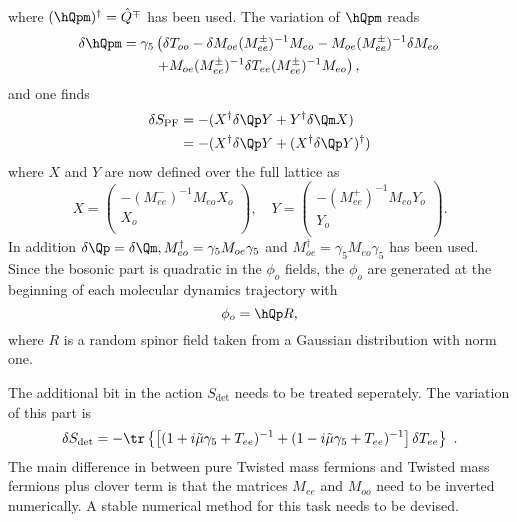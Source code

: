 where $(\hQpm)^\dagger = \hat Q^\mp$ has been used. The variation of
$\hQpm$ reads
\begin{equation}
  \label{eq:eosw7}
  \begin{split}
    \delta \hQpm = \gamma_5 & \left( \delta T_{oo}-\delta M_{oe}(M_{ee}^\pm )^{-1}M_{eo} -
      M_{oe}(M_{ee}^\pm )^{-1}\delta M_{eo}\right. \\
  &\left. + M_{oe}(M_{ee}^\pm )^{-1} \delta T_{ee} (M_{ee}^\pm )^{-1} M_{eo}\right),
  \end{split}
\end{equation}
and one finds
\begin{equation}
  \label{eq:eosw8}
  \begin{split}
    \delta S_\mathrm{PF} &= -(X^\dagger\delta \Qp Y + Y^\dagger\delta \Qm X) \\
    &= -(X^\dagger\delta \Qp Y +(X^\dagger\delta \Qp Y)^\dagger)
  \end{split}
\end{equation}
where $X$ and $Y$ are now defined over the full lattice as
\begin{equation}
  \label{eq:eosw9}
  X = 
  \begin{pmatrix}
    -(M_{ee}^-)^{-1}M_{eo}X_o \\ X_o\\
  \end{pmatrix},\quad
  Y = 
  \begin{pmatrix}
    -(M_{ee}^+)^{-1}M_{eo}Y_o \\ Y_o\\
  \end{pmatrix}.
\end{equation}
In addition $\delta\Qp = \delta\Qm, M_{eo}^\dagger = \gamma_5 M_{oe}\gamma_5$ and
$M_{oe}^\dagger = \gamma_5 M_{eo}\gamma_5$ has been used. Since the bosonic part
is quadratic in the $\phi_o$ fields, the $\phi_o$ are generated at the
beginning of each molecular dynamics trajectory with
\begin{equation}
  \label{eq:eosw10}
  \phi_o = \hQp R,
\end{equation}
where $R$ is a random spinor field taken from a Gaussian distribution
with norm one.

The additional bit in the action $S_{\det}$ needs to be treated
seperately. The variation of this part is
\begin{equation}
  \label{eq:eosw11}
  \delta S_{\det} = -\tr \left\{ \left[(1+i\tilde\mu\gamma_5 + T_{ee})^{-1}  +
    (1-i\tilde\mu\gamma_5 + T_{ee})^{-1}\right] \delta T_{ee} \right\} \ . 
\end{equation}
The main difference in between pure Twisted mass fermions and Twisted
mass fermions plus clover term is that the matrices $M_{ee}$ and
$M_{oo}$ need to be inverted numerically. A stable numerical method
for this task needs to be devised.


